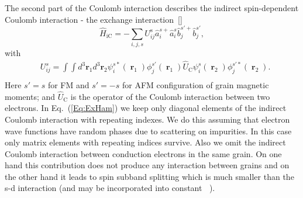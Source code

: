 \documentclass[aps,prb,amsmath,amssymb,twocolumn,superscriptaddress,showpacs,floatfix]{revtex4-1}
\DeclareMathOperator{\Ji}{\mathit J_{\mathrm{sd}}}
\DeclareMathOperator{\rv}{\mathbf r}
\begin{document}
The second part of the Coulomb interaction describes the indirect spin-dependent
Coulomb interaction - the
exchange interaction~[]
\begin{equation}\label{Eq:ExHam}
\hat H^\mathrm{}_\mathrm{iC}=-\sum_{i,j,s} U^{\mathrm{s}}_{ij}\hat a^{s+}_i\hat a^{s}_i\hat b^{s'+}_j\hat b^{s'}_j,
\end{equation}
with
\begin{equation}\label{Eq:ExMatEl}
\begin{split}
&U^{s}_{ij}=\!\int\!\!\int d^3\mathbf r_1 d^3 \mathbf r_2 \psi_i^{s*}(\rv_1)\phi^{s'}_j(\rv_1)\hat U_\mathrm C \psi^s_i(\rv_2)\phi^{s'*}_j(\rv_2).\\
\end{split}
\end{equation}
Here $s'=s$ for FM and $s'=-s$ for AFM configuration of grain magnetic moments;
and $\hat U_\mathrm C$ is the operator of the Coulomb interaction between two electrons.
In Eq.~(\ref{Eq:ExHam}) we keep only diagonal elements of the indirect Coulomb interaction with
repeating indexes. We do this assuming that electron wave functions have random phases due to scattering on impurities. In this case only matrix elements with repeating indices survive. Also we omit the indirect Coulomb interaction
between conduction electrons in the same grain. On one hand this contribution does not
produce any interaction between grains and on the other hand it leads to spin subband
splitting which is much smaller than the s-d interaction (and may be incorporated into constant $\Ji$).
\end{document}
